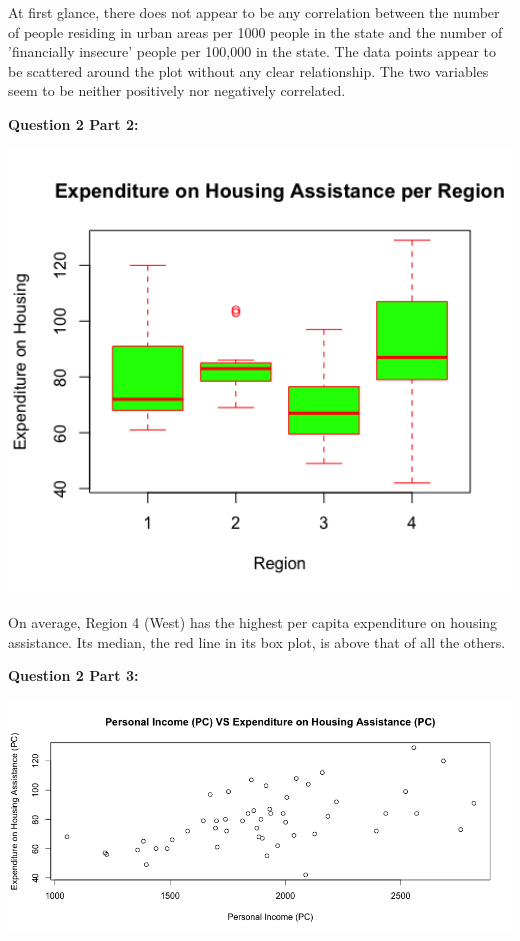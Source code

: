 \documentclass[12pt,letterpaper]{article}
\begin{document}
\noindent
At first glance, there does not appear to be any correlation between the number of people residing in urban areas per 1000 people in the state and the number of 'financially insecure' people per 100,000 in the state. The data points appear to be scattered around the plot without any clear relationship. The two variables seem to be neither positively nor negatively correlated.
\\\vspace{.5cm}



\newpage

\noindent
\textbf{Question 2 Part 2:}


\includegraphics[width=150mm]{Rplot Housing Assistance per Region}

\noindent
On average, Region 4 (West) has the highest per capita expenditure on housing assistance. Its median, the red line in its box plot, is above that of all the others.
\\\vspace{.5cm}



\newpage

\noindent
\textbf{Question 2 Part 3:}
\\\vspace{.5cm}

\includegraphics[width=150mm]{Rplot X1 against Y}
\end{document}
